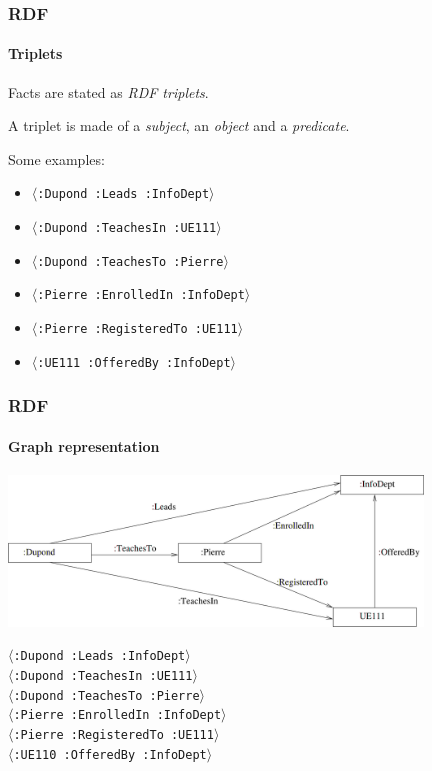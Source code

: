 \documentclass{beamer}
\newcommand{\triplet}[1]{$\langle$\texttt{#1}$\rangle$}
\begin{document}
\begin{frame}
  \frametitle{RDF}
  \framesubtitle{Triplets}

  Facts are stated as \textit{RDF triplets}.

  \pause

  \medskip

  A triplet is made of a \textit{subject}, an \textit{object} and a
  \textit{predicate}.

  \pause

  \medskip

  Some examples:

  \pause

  \begin{itemize}
    \item \triplet{:Dupond :Leads :InfoDept}

    \pause

    \item \triplet{:Dupond :TeachesIn :UE111}

    \pause

    \item \triplet{:Dupond :TeachesTo :Pierre}

    \pause

    \item \triplet{:Pierre :EnrolledIn :InfoDept}

    \pause

    \item \triplet{:Pierre :RegisteredTo :UE111}

    \pause

    \item \triplet{:UE111 :OfferedBy :InfoDept}
  \end{itemize}
\end{frame}

\begin{frame}
  \frametitle{RDF}
  \framesubtitle{Graph representation}

  \begin{center}
    \includegraphics[width=11cm]{graph.png}
  \end{center}

  \triplet{:Dupond :Leads :InfoDept} \\
  \triplet{:Dupond :TeachesIn :UE111} \\
  \triplet{:Dupond :TeachesTo :Pierre} \\
  \triplet{:Pierre :EnrolledIn :InfoDept} \\
  \triplet{:Pierre :RegisteredTo :UE111} \\
  \triplet{:UE110 :OfferedBy :InfoDept}
\end{frame}
\end{document}
